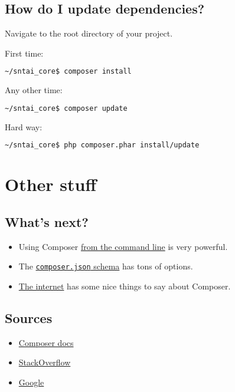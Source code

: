 \documentclass[pdf]{beamer}
\newcommand{\com}[1]{\lstinline$#1$}
\begin{document}
\subsection{How do I update dependencies?}
\begin{frame}[fragile]
Navigate to the root directory of your project.

First time:
\begin{lstlisting}[language=bash]
~/sntai_core$ composer install
\end{lstlisting}
Any other time:
\begin{lstlisting}[language=bash]
~/sntai_core$ composer update
\end{lstlisting}
Hard way:
\begin{lstlisting}[language=bash]
~/sntai_core$ php composer.phar install/update
\end{lstlisting}
\end{frame}
\section{Other stuff}
\subsection{What's next?}
\begin{frame}
\begin{itemize}
\item Using Composer \href{https://getcomposer.org/doc/03-cli.md}{from the command line} is very powerful.
\item The \href{https://getcomposer.org/doc/04-schema.md}{\com{composer.json} schema} has tons of options.
\item \href{https://www.google.com/webhp?q=composer+tricks}{The internet} has some nice things to say about Composer.
\end{itemize}
\end{frame}
\subsection{Sources}
\begin{frame}
\begin{itemize}
\item \href{https://getcomposer.org/doc/}{Composer docs}
\item \href{https://stackoverflow.com}{StackOverflow}
\item \href{https://google.com}{Google}
\end{itemize}
\end{frame}
\end{document}
